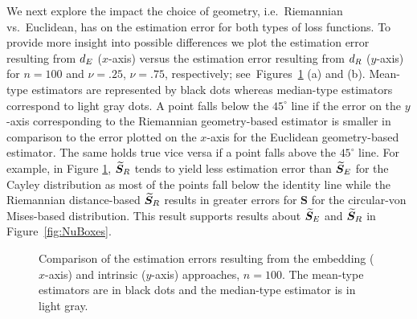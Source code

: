 We next explore the impact the choice of geometry, i.e.~Riemannian vs.~Euclidean, has on the estimation error for both types of loss functions. To provide more insight into possible differences we plot the estimation error resulting from ${d_E}$ ($x$-axis) versus the estimation error resulting from ${d_R}$ ($y$-axis) for $n=100$ and $\nu=.25$,  $\nu=.75$, respectively; see~Figures~\ref{fig:comPL2} (a) and (b).   
Mean-type estimators are represented by black dots whereas median-type estimators correspond to light gray dots. A point falls below the $45^\circ{}$ line if the error on the $y$-axis corresponding to the Riemannian geometry-based estimator is smaller in comparison to the error plotted on the $x$-axis for the Euclidean geometry-based estimator.  The same holds true vice versa if a point falls above the $45^\circ{}$ line. 
For example, in Figure \ref{fig:comPL2},  ${\widetilde{\bm S}_R}$ tends to yield less estimation error than ${\widetilde{\bm S}_E}$  for the Cayley distribution as most of the points fall below the identity line while the Riemannian distance-based ${\widetilde{\bm S}_R}$ results in greater errors for ${\bm S}$ for the circular-von Mises-based distribution.  This result supports results about ${\widetilde{\bm S}_E}$ and ${\widetilde{\bm S}_R}$ in Figure~\ref{fig:NuBoxes}.

\begin{figure}[h!]
\centering
{}\newline
{}
\caption{Comparison of the estimation errors resulting from the embedding ($x$-axis) and intrinsic ($y$-axis) approaches, $n=100$.  The mean-type estimators are in black dots and the median-type estimator is in light gray.}
\label{fig:comPL2}
\end{figure}

